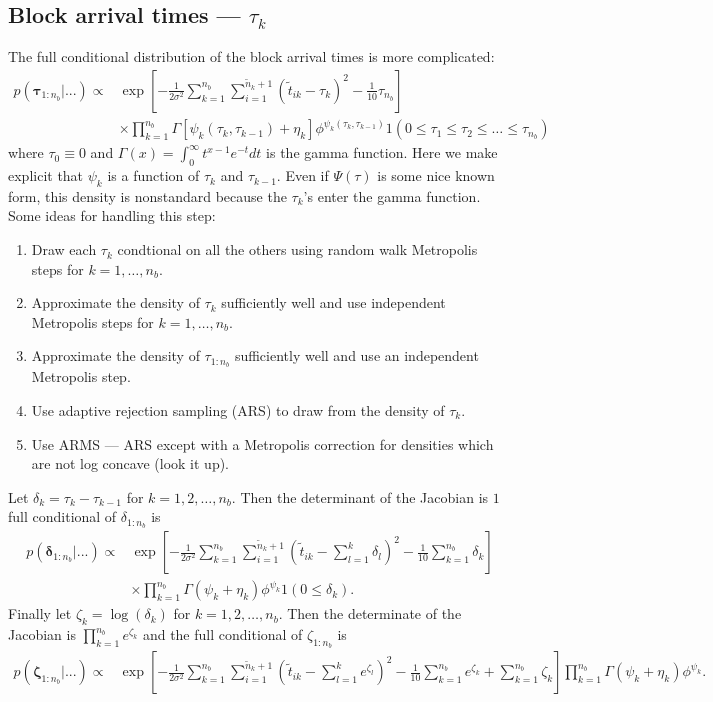\documentclass{article}
\begin{document}
\subsection{Block arrival times --- $\tau_k$}
The full conditional distribution of the block arrival times is more complicated:
\begin{align*}
p(\bm{\tau}_{1:n_{b}}|...) \propto & \exp\left[-\frac{1}{2\sigma^2}\sum_{k=1}^{n_{b}}\sum_{i=1}^{\widetilde{n}_k+1}\left(\widetilde{t}_{ik} - \tau_k\right)^2 - \frac{1}{10}\tau_{n_{b}}\right]\\
&\times \prod_{k=1}^{n_b}\Gamma[\psi_k(\tau_{k}, \tau_{k-1}) + \eta_k]\phi^{\psi_k(\tau_k,\tau_{k-1})}1(0\le \tau_1 \le \tau_2 \le \hdots \le \tau_{n_b})
\end{align*}
where $\tau_0\equiv0$ and $\Gamma(x) = \int_0^\infty t^{x-1}e^{-t}dt$ is the gamma function. Here we make explicit that $\psi_k$ is a function of $\tau_k$ and $\tau_{k-1}$. Even if $\Psi(\tau)$ is some nice known form, this density is nonstandard because the $\tau_k$'s enter the gamma function. Some ideas for handling this step:
\begin{enumerate}
\item Draw each $\tau_k$ condtional on all the others using random walk Metropolis steps for $k=1,\dots,n_{b}$.
\item Approximate the density of $\tau_k$ sufficiently well and use independent Metropolis steps for $k=1,\dots,n_{b}$.
\item Approximate the density of $\tau_{1:n_{b}}$ sufficiently well and use an independent Metropolis step.
\item Use adaptive rejection sampling (ARS) to draw from the density of $\tau_k$.
\item Use ARMS --- ARS except with a Metropolis correction for densities which are not log concave (look it up).
\end{enumerate}

Let $\delta_k = \tau_k - \tau_{k-1}$ for $k=1,2,\dots,n_b$. Then the determinant of the Jacobian is $1$ full conditional of $\delta_{1:n_b}$ is
\begin{align*}
p(\bm{\delta}_{1:n_{b}}|...) \propto & \exp\left[-\frac{1}{2\sigma^2}\sum_{k=1}^{n_{b}}\sum_{i=1}^{\widetilde{n}_k+1}\left(\widetilde{t}_{ik} - \sum_{l=1}^k\delta_l\right)^2 - \frac{1}{10}\sum_{k=1}^{n_b}\delta_{k}\right]\\
&\times \prod_{k=1}^{n_b}\Gamma(\psi_k + \eta_k)\phi^{\psi_k}1(0\le \delta_k).
\end{align*}
Finally let $\zeta_k = \log(\delta_k)$ for $k = 1, 2, \dots, n_b$. Then the determinate of the Jacobian is $\prod_{k=1}^{n_b}e^{\zeta_k}$ and the full conditional of $\zeta_{1:n_b}$ is
\begin{align*}
p(\bm{\zeta}_{1:n_{b}}|...) \propto & \exp\left[-\frac{1}{2\sigma^2}\sum_{k=1}^{n_{b}}\sum_{i=1}^{\widetilde{n}_k+1}\left(\widetilde{t}_{ik} - \sum_{l=1}^ke^{\zeta_l}\right)^2 - \frac{1}{10}\sum_{k=1}^{n_b}e^{\zeta_k} + \sum_{k=1}^{n_b}{\zeta_k}\right] \prod_{k=1}^{n_b}\Gamma(\psi_k + \eta_k)\phi^{\psi_k}.
\end{align*}
\end{document}
